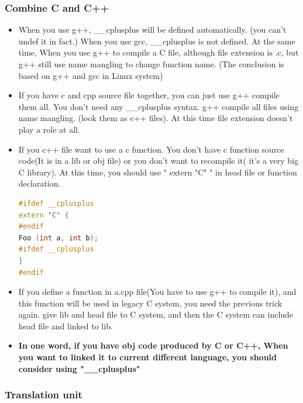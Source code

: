 \documentclass[a4paper,12pt,twoside]{book}
\begin{document}
\subsubsection{Combine C and C++}
\begin{itemize}

\item When you use g++,  \_\_cplusplus will be defined automatically. (you can't undef it in fact.) When you use gcc, \_\_cplusplus is not defined. At the same time, When you use g++ to compile a C file, although file extension is .c, but g++ still use name mangling to change function name.  (The conclusion is based on g++ and gcc in Linux system)

\item If you have c and cpp source file together, you can just use g++ compile them all. You don't need any \_\_cplusplus syntax.  g++ compile all files using name mangling. (look them as c++ files). At this time file extension doesn't play a role at all.

\item If you c++ file want to use a c function. You don't have c function source code(It is in a lib or obj file) or you don't want to recompile it( it's a very big C library). At this time, you should use " extern "C" " in head file or function declaration.
\begin{lstlisting}[frame=single, language=c++]
#ifdef __cplusplus
extern "C" {
#endif
Foo (int a, int b);
#ifdef __cplusplus
}
#endif
\end{lstlisting}

\item If you define a function in a.cpp file(You have to use g++ to compile it), and this function will be used in legacy C system, you need the previous trick again.  give lib and head file to C system,  and then the C system can include head file and linked to lib.

\item \textbf{In one word, if you have obj code produced by C or C++, When you want to linked it to current different language, you should consider using "\_\_cplusplus" }

\end{itemize}

\subsubsection{Translation unit}
\end{document}
